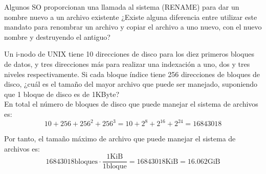 \begin{ejercicio}
Algunos SO proporcionan una llamada al sistema (RENAME) para dar un nombre nuevo a un archivo existente ¿Existe alguna diferencia entre utilizar este mandato para renombrar un archivo y copiar el archivo a uno nuevo, con el nuevo nombre y destruyendo el antiguo?
\end{ejercicio}

\begin{ejercicio}
Un i-nodo de UNIX tiene 10 direcciones de disco para los diez primeros bloques de datos, y tres direcciones más para realizar una indexación a uno, dos y tres niveles respectivamente.
Si cada bloque índice tiene 256 direcciones de bloques de disco, ¿cuál es el tamaño del mayor archivo que puede ser manejado, suponiendo que 1 bloque de disco es de 1KByte?\\
    
    En total el número de bloques de disco que puede manejar el sistema de archivos es:
    \begin{equation}
        10 + 256 + 256^2 + 256^3 = 10 + 2^{8} + 2^{16} + 2^{24} = 16843018
    \end{equation}

    Por tanto, el tamaño máximo de archivo que puede manejar el sistema de archivos es:
    \begin{equation}
        16843018 \text{bloques} \cdot \frac{1 \text{KiB}}{1 \text{bloque}} = 16843018 \text{KiB} = 16.062 \text{GiB}
    \end{equation}
\end{ejercicio}

